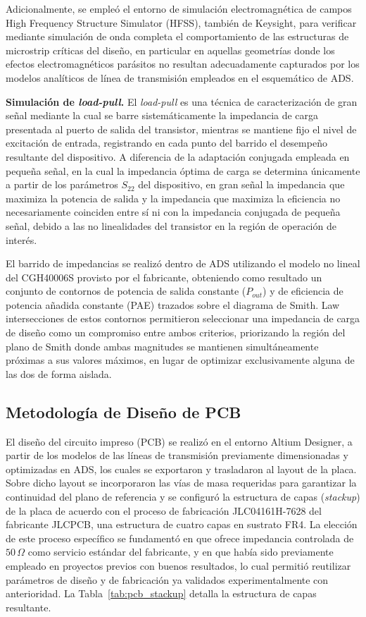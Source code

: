 Adicionalmente, se empleó el entorno de simulación electromagnética de campos High Frequency Structure Simulator (HFSS), también de Keysight, para verificar mediante simulación de onda completa el comportamiento de las estructuras de microstrip críticas del diseño, en particular en aquellas geometrías donde los efectos electromagnéticos parásitos no resultan adecuadamente capturados por los modelos analíticos de línea de transmisión empleados en el esquemático de ADS.

\textbf{Simulación de \textit{load-pull}.} El \textit{load-pull} es una técnica de caracterización de gran señal mediante la cual se barre sistemáticamente la impedancia de carga presentada al puerto de salida del transistor, mientras se mantiene fijo el nivel de excitación de entrada, registrando en cada punto del barrido el desempeño resultante del dispositivo. A diferencia de la adaptación conjugada empleada en pequeña señal, en la cual la impedancia óptima de carga se determina únicamente a partir de los parámetros $S_{22}$ del dispositivo, en gran señal la impedancia que maximiza la potencia de salida y la impedancia que maximiza la eficiencia no necesariamente coinciden entre sí ni con la impedancia conjugada de pequeña señal, debido a las no linealidades del transistor en la región de operación de interés.

El barrido de impedancias se realizó dentro de ADS utilizando el modelo no lineal del CGH40006S provisto por el fabricante, obteniendo como resultado un conjunto de contornos de potencia de salida constante ($P_{out}$) y de eficiencia de potencia añadida constante (PAE) trazados sobre el diagrama de Smith. Law intersecciones de estos contornos permitieron seleccionar una impedancia de carga de diseño como un compromiso entre ambos criterios, priorizando la región del plano de Smith donde ambas magnitudes se mantienen simultáneamente próximas a sus valores máximos, en lugar de optimizar exclusivamente alguna de las dos de forma aislada.

\subsection{Metodología de Diseño de PCB}
El diseño del circuito impreso (PCB) se realizó en el entorno Altium Designer, a partir de los modelos de las líneas de transmisión previamente dimensionadas y optimizadas en ADS, los cuales se exportaron y trasladaron al layout de la placa. Sobre dicho layout se incorporaron las vías de masa requeridas para garantizar la continuidad del plano de referencia y se configuró la estructura de capas (\textit{stackup}) de la placa de acuerdo con el proceso de fabricación JLC04161H-7628 del fabricante JLCPCB, una estructura de cuatro capas en sustrato FR4. La elección de este proceso específico se fundamentó en que ofrece impedancia controlada de $50\,\Omega$ como servicio estándar del fabricante, y en que había sido previamente empleado en proyectos previos con buenos resultados, lo cual permitió reutilizar parámetros de diseño y de fabricación ya validados experimentalmente con anterioridad. La Tabla~\ref{tab:pcb_stackup} detalla la estructura de capas resultante.

